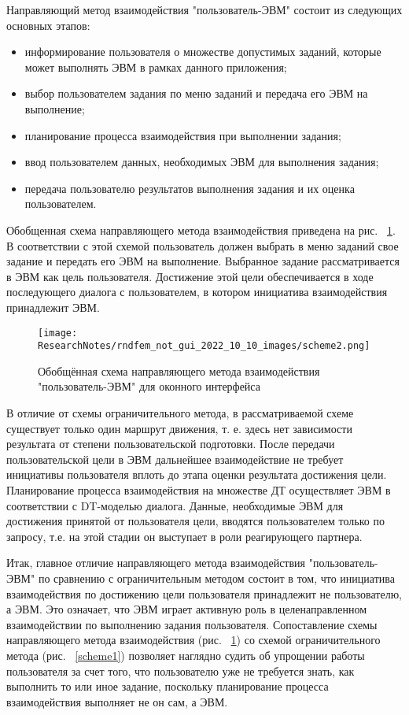 	Направляющий метод взаимодействия "пользователь-ЭВМ" состоит из следующих основных этапов:
\begin{itemize}
	\item информирование пользователя о множестве допустимых заданий, которые может выполнять ЭВМ в рамках данного приложения;
	\item выбор пользователем задания по меню заданий и передача его ЭВМ на выполнение;
	\item планирование процесса взаимодействия при выполнении задания;
	\item ввод пользователем данных, необходимых ЭВМ для выполнения задания;
	\item передача пользователю результатов выполнения задания и их оценка пользователем. 
\end{itemize}

Обобщенная схема направляющего метода взаимодействия приведена на рис. ~\ref{scheme2}. В соответствии с этой схемой пользователь должен выбрать в меню заданий свое задание и передать его ЭВМ на выполнение. Выбранное задание рассматривается в ЭВМ как цель пользователя. Достижение этой цели обеспечивается в ходе последующего диалога с пользователем, в котором инициатива взаимодействия принадлежит ЭВМ.

\begin{figure}[!ht]
  \centering
  \texttt{[image: ResearchNotes/rndfem\_not\_gui\_2022\_10\_10\_images/scheme2.png]}
  \caption{Обобщённая схема направляющего метода взаимодействия "пользователь-ЭВМ" для оконного интерфейса}
  \label{scheme2}
\end{figure}

	В отличие от схемы ограничительного метода, в рассматриваемой схеме существует только один маршрут движения, т. е. здесь нет зависимости результата от степени пользовательской подготовки. После передачи пользовательской цели в ЭВМ дальнейшее взаимодействие не требует инициативы пользователя вплоть до этапа оценки результата достижения цели. Планирование процесса взаимодействия на множестве ДТ осуществляет ЭВМ в соответствии с DT-моделью диалога. Данные, необходимые ЭВМ для достижения принятой от пользователя цели, вводятся пользователем только по запросу, т.е. на этой стадии он выступает в роли реагирующего партнера.

	Итак, главное отличие направляющего метода взаимодействия "пользователь-ЭВМ" по сравнению с ограничительным методом состоит в том, что инициатива взаимодействия по достижению цели пользователя принадлежит не пользователю, а ЭВМ. Это означает, что ЭВМ играет активную роль в целенаправленном взаимодействии по выполнению задания пользователя. Сопоставление схемы направляющего метода взаимодействия (рис. ~\ref{scheme2}) со схемой ограничительного метода (рис. ~\ref{scheme1}) позволяет наглядно судить об упрощении работы пользователя за счет того, что пользователю уже не требуется знать, как выполнить то или иное задание, поскольку планирование процесса взаимодействия выполняет не он сам, а ЭВМ.
\noteattributes{}

